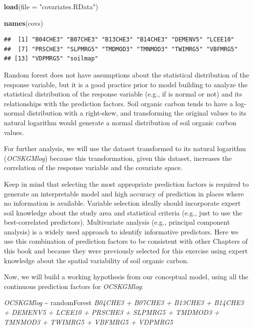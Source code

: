 \documentclass[10pt,b5paper,]{book}
\newenvironment{Shaded}{\begin{snugshade}}{\end{snugshade}}
\newcommand{\DataTypeTok}[1]{\textcolor[rgb]{0.13,0.29,0.53}{#1}}
\newcommand{\KeywordTok}[1]{\textcolor[rgb]{0.13,0.29,0.53}{\textbf{#1}}}
\newcommand{\NormalTok}[1]{#1}
\newcommand{\StringTok}[1]{\textcolor[rgb]{0.31,0.60,0.02}{#1}}
\theoremstyle{definition}
\theoremstyle{definition}
\theoremstyle{definition}
\theoremstyle{remark}
\begin{document}
\begin{Shaded}
\begin{Highlighting}[]
\KeywordTok{load}\NormalTok{(}\DataTypeTok{file =} \StringTok{"covariates.RData"}\NormalTok{)}

\KeywordTok{names}\NormalTok{(covs)}
\end{Highlighting}
\end{Shaded}

\begin{verbatim}
##  [1] "B04CHE3" "B07CHE3" "B13CHE3" "B14CHE3" "DEMENV5" "LCEE10" 
##  [7] "PRSCHE3" "SLPMRG5" "TMDMOD3" "TMNMOD3" "TWIMRG5" "VBFMRG5"
## [13] "VDPMRG5" "soilmap"
\end{verbatim}

Random forest does not have assumptions about the statistical
distribution of the response variable, but it is a good practice prior
to model building to analyze the statistical distribution of the
response variable (e.g., if is normal or not) and its relationships with
the prediction factors. Soil organic carbon tends to have a log-normal
distribution with a right-skew, and transforming the original values to
its natural logarithm would generate a normal distribution of soil
organic carbon values.

For further analysis, we will use the dataset transformed to its natural
logarithm (\emph{OCSKGMlog}) because this transformation, given this
dataset, increases the correlation of the response variable and the
covariate space.

Keep in mind that selecting the most appropriate prediction factors is
required to generate an interpretable model and high accuracy of
prediction in places where no information is available. Variable
selection ideally should incorporate expert soil knowledge about the
study area and statistical criteria (e.g., just to use the
best-correlated predictors). Multivariate analysis (e.g., principal
component analysis) is a widely used approach to identify informative
predictors. Here we use this combination of prediction factors to be
consistent with other Chapters of this book and because they were
previously selected for this exercise using expert knowledge about the
spatial variability of soil organic carbon.

Now, we will build a working hypothesis from our conceptual model, using
all the continuous prediction factors for \emph{OCSKGMlog}:

\emph{OCSKGMlog} \textasciitilde{} randomForest \emph{B04CHE3 + B07CHE3
+ B13CHE3 + B14CHE3 + DEMENV5 + LCEE10 + PRSCHE3 + SLPMRG5 + TMDMOD3 +
TMNMOD3 + TWIMRG5 + VBFMRG5 + VDPMRG5}
\end{document}
